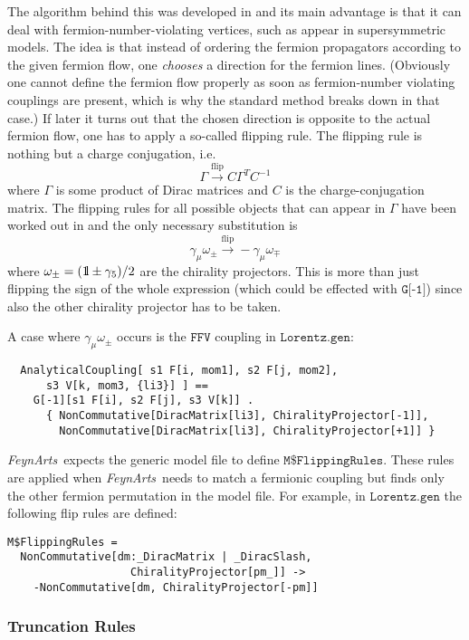 \documentclass[twoside,12pt]{article}
\makeatletter
\def\indextt#1{\index{#1@\texttt{#1}}}
\def\FA{\textit{FeynArts}}
\def\ie{i.e.\ }
\def\unity{{\rm 1\mskip-4.25mu l}}
\def\Code#1{\ensuremath{\texttt{#1}}}
\makeatother
\begin{document}
The algorithm behind this was developed in \cite{DeEHK92} and its main
advantage is that it can deal with fermion-number-violating vertices,
such as appear in supersymmetric models.  The idea is that instead of
ordering the fermion propagators according to the given fermion flow,
one \emph{chooses} a direction for the fermion lines.  (Obviously one
cannot define the fermion flow properly as soon as fermion-number
violating couplings are present, which is why the standard method breaks
down in that case.)  If later it turns out that the chosen direction is
opposite to the actual fermion flow, one has to apply a so-called
flipping rule.  The flipping rule is nothing but a charge conjugation,
\ie
$$
\Gamma \overset{\text{flip}}{\longrightarrow} C \Gamma^T C^{-1}
$$
where $\Gamma$ is some product of Dirac matrices and $C$ is the
charge-conjugation matrix.  The flipping rules for all possible objects
that can appear in $\Gamma$ have been worked out in \cite{DeEHK92} and the
only necessary substitution is
$$
\gamma_\mu\omega_\pm \overset{\text{flip}}{\longrightarrow}
-\gamma_\mu\omega_\mp
$$
%
where $\omega_\pm = (\unity\pm\gamma_5)/2$ are the chirality projectors. 
This is more than just flipping the sign of the whole expression (which
could be effected with \Code{G[-1]}) since also the other chirality
projector has to be taken.

A case where $\gamma_\mu\omega_\pm$ occurs is the \Code{FFV} coupling
in \Code{Lorentz.gen}:
\begin{verbatim}
  AnalyticalCoupling[ s1 F[i, mom1], s2 F[j, mom2],
      s3 V[k, mom3, {li3}] ] ==
    G[-1][s1 F[i], s2 F[j], s3 V[k]] .
      { NonCommutative[DiracMatrix[li3], ChiralityProjector[-1]],
        NonCommutative[DiracMatrix[li3], ChiralityProjector[+1]] }
\end{verbatim}

\FA\ expects the generic model file to define \Code{M\$FlippingRules}.
These rules are applied when \FA\ needs to match a fermionic coupling 
but finds only the other fermion permutation in the model file.
For example, in \Code{Lorentz.gen} the following flip rules are 
defined:
\indextt{M\$FlippingRules}%
\begin{verbatim}
M$FlippingRules =
  NonCommutative[dm:_DiracMatrix | _DiracSlash,
                   ChiralityProjector[pm_]] ->
    -NonCommutative[dm, ChiralityProjector[-pm]]
\end{verbatim}


\subsubsection*{Truncation Rules}
\end{document}
